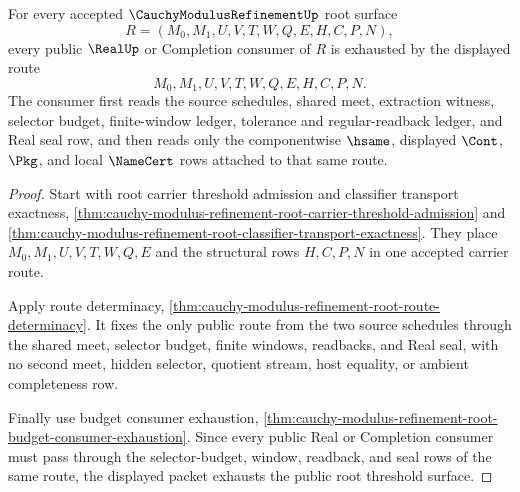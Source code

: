 \begin{theorem}
\label{thm:cauchy-modulus-refinement-root-threshold-public-exhaustion}
For every accepted $\CauchyModulusRefinementUp$ root surface
$$
R=(M_0,M_1,U,V,T,W,Q,E,H,C,P,N),
$$
every public $\RealUp$ or Completion consumer of $R$ is exhausted by the displayed route
$$
M_0,M_1,U,V,T,W,Q,E,H,C,P,N.
$$
The consumer first reads the source schedules, shared meet, extraction witness, selector budget, finite-window ledger, tolerance and regular-readback ledger, and Real seal row, and then reads only the componentwise $\hsame$, displayed $\Cont$, $\Pkg$, and local $\NameCert$ rows attached to that same route.
\end{theorem}
\begin{proof}
Start with root carrier threshold admission and classifier transport exactness, \autoref{thm:cauchy-modulus-refinement-root-carrier-threshold-admission} and \autoref{thm:cauchy-modulus-refinement-root-classifier-transport-exactness}. They place $M_0,M_1,U,V,T,W,Q,E$ and the structural rows $H,C,P,N$ in one accepted carrier route.

Apply route determinacy, \autoref{thm:cauchy-modulus-refinement-root-route-determinacy}. It fixes the only public route from the two source schedules through the shared meet, selector budget, finite windows, readbacks, and Real seal, with no second meet, hidden selector, quotient stream, host equality, or ambient completeness row.

Finally use budget consumer exhaustion, \autoref{thm:cauchy-modulus-refinement-root-budget-consumer-exhaustion}. Since every public Real or Completion consumer must pass through the selector-budget, window, readback, and seal rows of the same route, the displayed packet exhausts the public root threshold surface.
\end{proof}

